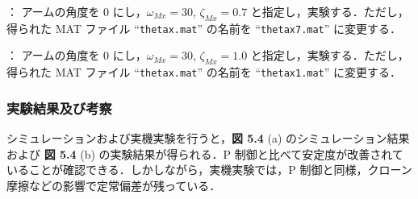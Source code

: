 \noindent
{}：
アームの角度を 0 にし，$\omega_{Mx} = 30$, $\zeta_{Mx} = 0.7$ と指定し，実験する．ただし，得られた MAT ファイル ``\texttt{thetax.mat}'' の名前を ``\texttt{thetax7.mat}'' に変更する．

\vspace{1em}

\noindent
{}：
アームの角度を 0 にし，$\omega_{Mx} = 30$, $\zeta_{Mx} = 1.0$ と指定し，実験する．ただし，得られた MAT ファイル ``\texttt{thetax.mat}'' の名前を ``\texttt{thetax1.mat}'' に変更する．

\subsubsection{実験結果及び考察}

シミュレーションおよび実機実験を行うと，\textbf{図 5.4} (a) のシミュレーション結果および \textbf{図 5.4} (b) の実験結果が得られる．P 制御と比べて安定度が改善されていることが確認できる．しかしながら，実機実験では，P 制御と同様，クローン摩擦などの影響で定常偏差が残っている．


